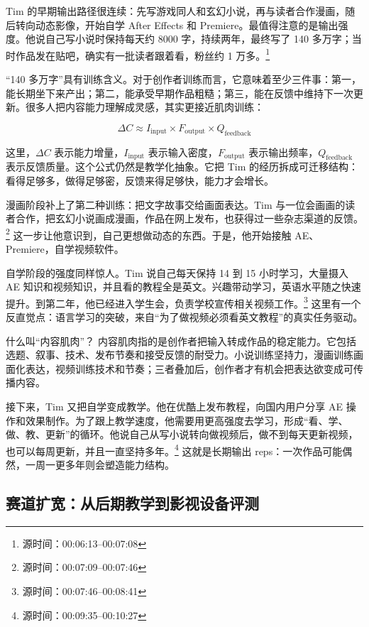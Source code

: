 Tim 的早期输出路径很连续：先写游戏同人和玄幻小说，再与读者合作漫画，随后转向动态影像，开始自学 After Effects 和 Premiere。最值得注意的是输出强度。他说自己写小说时保持每天约 8000 字，持续两年，最终写了 140 多万字；当时作品发在贴吧，确实有一批读者跟着看，粉丝约 1 万多。\footnote{源时间：00:06:13--00:07:08}

“140 多万字”具有训练含义。对于创作者训练而言，它意味着至少三件事：第一，能长期坐下来产出；第二，能承受早期作品粗糙；第三，能在反馈中维持下一次更新。很多人把内容能力理解成灵感，其实更接近肌肉训练：

$$
\Delta C \approx I_{\text{input}} \times F_{\text{output}} \times Q_{\text{feedback}}
$$

这里，$\Delta C$ 表示能力增量，$I_{\text{input}}$ 表示输入密度，$F_{\text{output}}$ 表示输出频率，$Q_{\text{feedback}}$ 表示反馈质量。这个公式仍然是教学化抽象。它把 Tim 的经历拆成可迁移结构：看得足够多，做得足够密，反馈来得足够快，能力才会增长。

漫画阶段补上了第二种训练：把文字故事交给画面表达。Tim 与一位会画画的读者合作，把玄幻小说画成漫画，作品在网上发布，也获得过一些杂志渠道的反馈。\footnote{源时间：00:07:09--00:07:46} 这一步让他意识到，自己更想做动态的东西。于是，他开始接触 AE、Premiere，自学视频软件。

自学阶段的强度同样惊人。Tim 说自己每天保持 14 到 15 小时学习，大量摄入 AE 知识和视频知识，并且看的教程全是英文。兴趣带动学习，英语水平随之快速提升。到第二年，他已经进入学生会，负责学校宣传相关视频工作。\footnote{源时间：00:07:46--00:08:41} 这里有一个反直觉点：语言学习的突破，来自“为了做视频必须看英文教程”的真实任务驱动。

\begin{knowledgebox}{什么叫“内容肌肉”？}
内容肌肉指的是创作者把输入转成作品的稳定能力。它包括选题、叙事、技术、发布节奏和接受反馈的耐受力。小说训练坚持力，漫画训练画面化表达，视频训练技术和节奏；三者叠加后，创作者才有机会把表达欲变成可传播内容。
\end{knowledgebox}

接下来，Tim 又把自学变成教学。他在优酷上发布教程，向国内用户分享 AE 操作和效果制作。为了跟上教学速度，他需要用更高强度去学习，形成“看、学、做、教、更新”的循环。他说自己从写小说转向做视频后，做不到每天更新视频，也可以每周更新，并且一直坚持多年。\footnote{源时间：00:09:35--00:10:27} 这就是长期输出 reps：一次作品可能偶然，一周一更多年则会塑造能力结构。

\subsection{赛道扩宽：从后期教学到影视设备评测}

